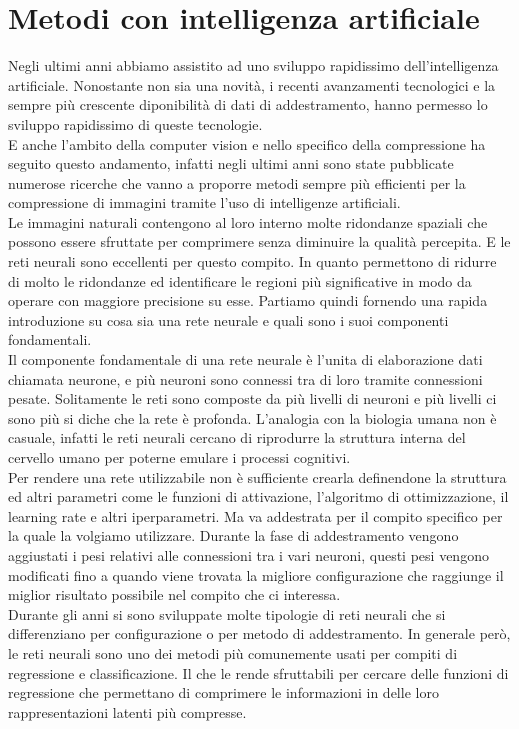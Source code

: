 \chapter{Metodi con intelligenza artificiale}
Negli ultimi anni abbiamo assistito ad uno sviluppo rapidissimo dell’intelligenza artificiale. Nonostante non sia una novità, i recenti avanzamenti tecnologici e la sempre più crescente diponibilità di dati di addestramento, hanno permesso lo sviluppo rapidissimo di queste tecnologie.\\
E anche l’ambito della computer vision e nello specifico della compressione ha seguito questo andamento, infatti negli ultimi anni sono state pubblicate numerose ricerche che vanno a proporre metodi sempre più efficienti per la compressione di immagini tramite l’uso di intelligenze artificiali.\\
Le immagini naturali contengono al loro interno molte ridondanze spaziali che possono essere sfruttate per comprimere senza diminuire la qualità percepita. E le reti neurali sono eccellenti per questo compito. In quanto permettono di ridurre di molto le ridondanze ed identificare le regioni più significative in modo da operare con maggiore precisione su esse.
Partiamo quindi fornendo una rapida introduzione su cosa sia una rete neurale e quali sono i suoi componenti fondamentali.\\
Il componente fondamentale di una rete neurale è l’unita di elaborazione dati chiamata neurone, e più neuroni sono connessi tra di loro tramite connessioni pesate. Solitamente le reti sono composte da più livelli di neuroni e più livelli ci sono più si diche che la rete è profonda. L’analogia con la biologia umana non è casuale, infatti le reti neurali cercano di riprodurre la struttura interna del cervello umano per poterne emulare i processi cognitivi. \cite{sadeeq2021image}\\
Per rendere una rete utilizzabile non è sufficiente crearla definendone la struttura ed altri parametri come le funzioni di attivazione, l’algoritmo di ottimizzazione, il learning rate e altri iperparametri. Ma va addestrata per il compito specifico per la quale la volgiamo utilizzare. Durante la fase di addestramento vengono aggiustati i pesi relativi alle connessioni tra i vari neuroni, questi pesi vengono modificati fino a quando viene trovata la migliore configurazione che raggiunge il miglior risultato possibile nel compito che ci interessa.\\
Durante gli anni si sono sviluppate molte tipologie di reti neurali che si differenziano per configurazione o per metodo di addestramento. In generale però, le reti neurali sono uno dei metodi più comunemente usati per compiti di regressione e classificazione. \cite{sadeeq2021image} Il che le rende sfruttabili per cercare delle funzioni di regressione che permettano di comprimere le informazioni in delle loro rappresentazioni latenti più compresse.
